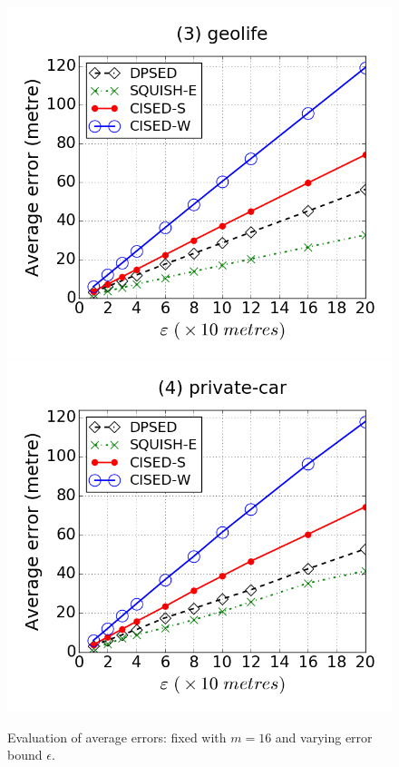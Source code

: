 \begin{figure}[tb]
\includegraphics[scale = 0.250]{figures/Exp-error-epsilon-geolife.png}
\includegraphics[scale = 0.250]{figures/Exp-error-epsilon-private.png}
\vspace{-2ex}
\caption{\small Evaluation of average errors: fixed with $m=16$ and varying error bound $\epsilon$.}
\label{fig:ae-m16}
\vspace{-2ex}
\end{figure}



